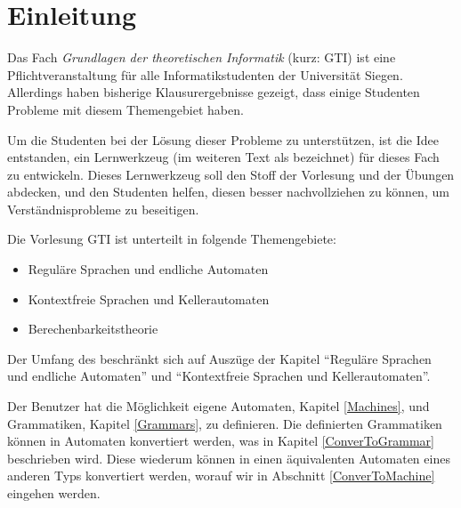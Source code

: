 



\chapter{Einleitung}\label{Introduction}

Das Fach {\em Grundlagen der theoretischen Informatik} (kurz: GTI) ist eine
Pflichtveranstaltung für alle Informatikstudenten der Universität Siegen.
Allerdings haben bisherige Klausurergebnisse gezeigt, dass einige Studenten
Probleme mit diesem Themengebiet haben.\vspace{10pt}

Um die Studenten bei der Lösung dieser Probleme zu unterstützen, ist die Idee
entstanden, ein Lernwerkzeug (im weiteren Text als {\em \gtitool} bezeichnet)
für dieses Fach zu entwickeln. Dieses Lernwerkzeug soll den Stoff der Vorlesung
und der Übungen abdecken, und den Studenten helfen, diesen besser
nachvollziehen zu können, um Verständnisprobleme zu beseitigen.\vspace{10pt}

\noindent
Die Vorlesung GTI ist unterteilt in folgende Themengebiete:\vspace{10pt} 

\begin{itemize}
  \item Reguläre Sprachen und endliche Automaten
  \item Kontextfreie Sprachen und Kellerautomaten
  \item Berechenbarkeitstheorie
\end{itemize}\vspace{10pt}

\noindent
Der Umfang des \gtitools beschränkt sich auf Auszüge der Kapitel
"`Reguläre Sprachen und endliche Automaten"' und "`Kontextfreie Sprachen und
Kellerautomaten"'.\vspace{10pt}

Der Benutzer hat die Möglichkeit eigene Automaten, Kapitel \ref{Machines}, und
Grammatiken, Kapitel \ref{Grammars},  zu definieren. Die definierten Grammatiken
können in Automaten konvertiert werden, was in Kapitel \ref{ConverToGrammar}
beschrieben wird. Diese wiederum können in einen äquivalenten Automaten
eines anderen Typs konvertiert werden, worauf wir in Abschnitt 
\ref{ConverToMachine} eingehen werden. \vspace{10pt}


